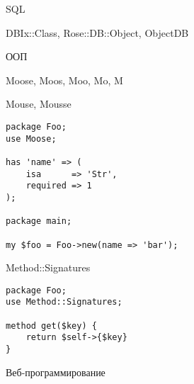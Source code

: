 \documentclass[14pt]{beamer}
\begin{document}
\begin{frame}
    \begin{center}
        SQL
    \end{center}
\end{frame}

\begin{frame}
    \begin{center}
        DBIx::Class, Rose::DB::Object, ObjectDB
    \end{center}
\end{frame}

\begin{frame}
    \begin{center}
        ООП
    \end{center}
\end{frame}

\begin{frame}
    \begin{center}
        Moose, Moos, Moo, Mo, M

        Mouse, Mousse
    \end{center}
\end{frame}

\begin{frame}[fragile]
    \lstset{language=Perl}
    \begin{lstlisting}
package Foo;
use Moose;

has 'name' => (
    isa      => 'Str',
    required => 1
);

package main;

my $foo = Foo->new(name => 'bar');

    \end{lstlisting}
\end{frame}

\begin{frame}
    \begin{center}
        Method::Signatures
    \end{center}
\end{frame}

\begin{frame}[fragile]
    \lstset{language=Perl}
    \begin{lstlisting}
package Foo;
use Method::Signatures;

method get($key) {
    return $self->{$key}
}

    \end{lstlisting}
\end{frame}

\begin{frame}
    \begin{center}
        Веб-программирование
    \end{center}
\end{frame}
\end{document}
